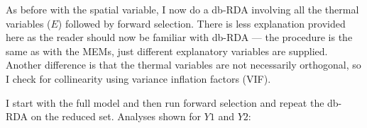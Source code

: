 \documentclass[10pt,A4,]{article}
\newenvironment{Shaded}{\begin{snugshade}}{\end{snugshade}}
\newcommand{\KeywordTok}[1]{\textcolor[rgb]{0.13,0.29,0.53}{\textbf{#1}}}
\newcommand{\DataTypeTok}[1]{\textcolor[rgb]{0.13,0.29,0.53}{#1}}
\newcommand{\DecValTok}[1]{\textcolor[rgb]{0.00,0.00,0.81}{#1}}
\newcommand{\StringTok}[1]{\textcolor[rgb]{0.31,0.60,0.02}{#1}}
\newcommand{\CommentTok}[1]{\textcolor[rgb]{0.56,0.35,0.01}{\textit{#1}}}
\newcommand{\OperatorTok}[1]{\textcolor[rgb]{0.81,0.36,0.00}{\textbf{#1}}}
\newcommand{\NormalTok}[1]{#1}
\begin{document}
As before with the spatial variable, I now do a db-RDA involving all the
thermal variables (\(E\)) followed by forward selection. There is less
explanation provided here as the reader should now be familiar with
db-RDA --- the procedure is the same as with the MEMs, just different
explanatory variables are supplied. Another difference is that the
thermal variables are not necessarily orthogonal, so I check for
collinearity using variance inflation factors (VIF).

I start with the full model and then run forward selection and repeat
the db-RDA on the reduced set. Analyses shown for \(Y1\) and \(Y2\):

\begin{Shaded}
\end{Shaded}

\begin{Shaded}
\end{Shaded}
\end{document}
